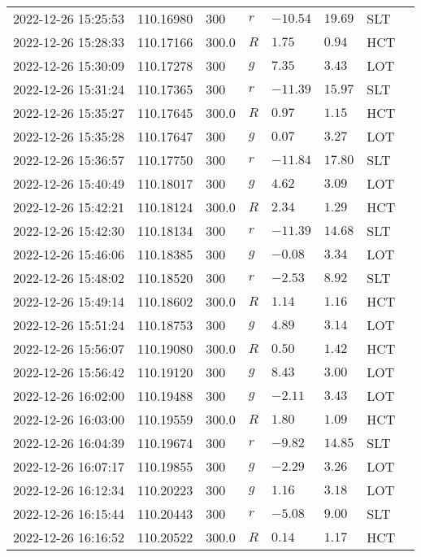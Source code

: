 \documentclass{nature_plusfigure}
\begin{document}
\begin{supplement}
\begin{center}
\begin{longtable}{llllllll}
2022-12-26 15:25:53 & 110.16980 & 300 & $r$ & $-10.54$ & $19.69$ & SLT &  \\ 
2022-12-26 15:28:33 & 110.17166 & 300.0 & $R$ & $1.75$ & $0.94$ & HCT &  \\ 
2022-12-26 15:30:09 & 110.17278 & 300 & $g$ & $7.35$ & $3.43$ & LOT &  \\ 
2022-12-26 15:31:24 & 110.17365 & 300 & $r$ & $-11.39$ & $15.97$ & SLT &  \\ 
2022-12-26 15:35:27 & 110.17645 & 300.0 & $R$ & $0.97$ & $1.15$ & HCT &  \\ 
2022-12-26 15:35:28 & 110.17647 & 300 & $g$ & $0.07$ & $3.27$ & LOT &  \\ 
2022-12-26 15:36:57 & 110.17750 & 300 & $r$ & $-11.84$ & $17.80$ & SLT &  \\ 
2022-12-26 15:40:49 & 110.18017 & 300 & $g$ & $4.62$ & $3.09$ & LOT &  \\ 
2022-12-26 15:42:21 & 110.18124 & 300.0 & $R$ & $2.34$ & $1.29$ & HCT &  \\ 
2022-12-26 15:42:30 & 110.18134 & 300 & $r$ & $-11.39$ & $14.68$ & SLT &  \\ 
2022-12-26 15:46:06 & 110.18385 & 300 & $g$ & $-0.08$ & $3.34$ & LOT &  \\ 
2022-12-26 15:48:02 & 110.18520 & 300 & $r$ & $-2.53$ & $8.92$ & SLT &  \\ 
2022-12-26 15:49:14 & 110.18602 & 300.0 & $R$ & $1.14$ & $1.16$ & HCT &  \\ 
2022-12-26 15:51:24 & 110.18753 & 300 & $g$ & $4.89$ & $3.14$ & LOT &  \\ 
2022-12-26 15:56:07 & 110.19080 & 300.0 & $R$ & $0.50$ & $1.42$ & HCT &  \\ 
2022-12-26 15:56:42 & 110.19120 & 300 & $g$ & $8.43$ & $3.00$ & LOT &  \\ 
2022-12-26 16:02:00 & 110.19488 & 300 & $g$ & $-2.11$ & $3.43$ & LOT &  \\ 
2022-12-26 16:03:00 & 110.19559 & 300.0 & $R$ & $1.80$ & $1.09$ & HCT &  \\ 
2022-12-26 16:04:39 & 110.19674 & 300 & $r$ & $-9.82$ & $14.85$ & SLT &  \\ 
2022-12-26 16:07:17 & 110.19855 & 300 & $g$ & $-2.29$ & $3.26$ & LOT &  \\ 
2022-12-26 16:12:34 & 110.20223 & 300 & $g$ & $1.16$ & $3.18$ & LOT &  \\ 
2022-12-26 16:15:44 & 110.20443 & 300 & $r$ & $-5.08$ & $9.00$ & SLT &  \\ 
2022-12-26 16:16:52 & 110.20522 & 300.0 & $R$ & $0.14$ & $1.17$ & HCT &  \\ 

\end{longtable}
\end{center}
\end{supplement}
\end{document}
